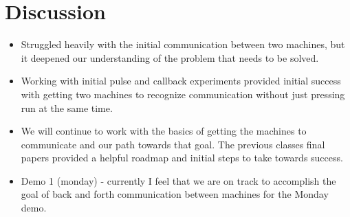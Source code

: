 \documentclass{article}
\begin{document}
\section*{Discussion}
\begin{itemize}
\item Struggled heavily with the initial communication between two machines, but it deepened our understanding of the problem that needs to be solved.
\item Working with initial pulse and callback experiments provided initial success with getting two machines to recognize communication without just pressing run at the same time. 
\item We will continue to work with the basics of getting the machines to communicate and our path towards that goal. The previous classes final papers provided a helpful roadmap and initial steps to take towards success.
\item Demo 1 (monday) - currently I feel that we are on track to accomplish the goal of back and forth communication between machines for the Monday demo. 
\end{itemize}
\end{document}
